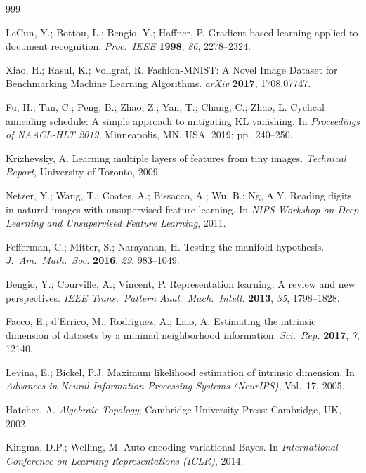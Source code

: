 \documentclass[make,article,submit,pdftex,moreauthors]{Definitions/mdpi}
\begin{document}
\begin{thebibliography}{999}

LeCun, Y.; Bottou, L.; Bengio, Y.; Haffner, P.
Gradient-based learning applied to document recognition.
\textit{Proc.\ IEEE} \textbf{1998}, \textit{86}, 2278--2324.

Xiao, H.; Rasul, K.; Vollgraf, R.
Fashion-{MNIST}: A Novel Image Dataset for Benchmarking Machine Learning
Algorithms.
\textit{arXiv} \textbf{2017}, 1708.07747.

Fu, H.; Tan, C.; Peng, B.; Zhao, Z.; Yan, T.; Chang, C.; Zhao, L.
Cyclical annealing schedule: A simple approach to mitigating {KL} vanishing.
In \textit{Proceedings of NAACL-HLT 2019}, Minneapolis, MN, USA, 2019;
pp.~240--250.

Krizhevsky, A.
Learning multiple layers of features from tiny images.
\textit{Technical Report}, University of Toronto, 2009.

Netzer, Y.; Wang, T.; Coates, A.; Bissacco, A.; Wu, B.; Ng, A.Y.
Reading digits in natural images with unsupervised feature learning.
In \textit{NIPS Workshop on Deep Learning and Unsupervised Feature Learning},
2011.

Fefferman, C.; Mitter, S.; Narayanan, H.
Testing the manifold hypothesis.
\textit{J.\ Am.\ Math.\ Soc.} \textbf{2016}, \textit{29}, 983--1049.

Bengio, Y.; Courville, A.; Vincent, P.
Representation learning: A review and new perspectives.
\textit{IEEE Trans.\ Pattern Anal.\ Mach.\ Intell.} \textbf{2013},
\textit{35}, 1798--1828.

Facco, E.; d'Errico, M.; Rodriguez, A.; Laio, A.
Estimating the intrinsic dimension of datasets by a minimal neighborhood
information.
\textit{Sci.\ Rep.} \textbf{2017}, \textit{7}, 12140.

Levina, E.; Bickel, P.J.
Maximum likelihood estimation of intrinsic dimension.
In \textit{Advances in Neural Information Processing Systems (NeurIPS)},
Vol.~17, 2005.

Hatcher, A.
\textit{Algebraic Topology};
Cambridge University Press: Cambridge, UK, 2002.

Kingma, D.P.; Welling, M.
Auto-encoding variational Bayes.
In \textit{International Conference on Learning Representations (ICLR)},
2014.


\end{thebibliography}
\end{document}
